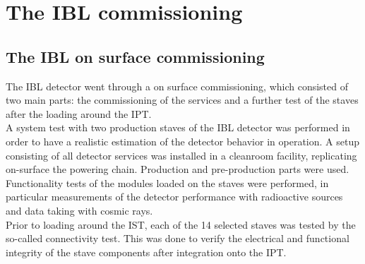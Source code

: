 \section{The IBL commissioning}\label{sec:IBL_commissioning}
\subsection{The IBL on surface commissioning}
%
The IBL detector went through a on surface commissioning, which consisted of two main parts: the commissioning of the services and a further test of the staves after the loading around the IPT.\\
A system test with two production staves of the IBL detector was performed in order to have a realistic estimation of the detector behavior in operation. A setup consisting of all detector services was installed in a cleanroom facility, replicating on-surface the powering chain. Production and pre-production parts were used. Functionality tests of the modules loaded on the staves were performed, in particular measurements of the detector performance with radioactive sources and data taking with cosmic rays.\\
Prior to loading around the IST, each of the 14 selected staves was tested by the so-called connectivity test. This was done to verify the electrical and functional integrity of the stave components after integration onto the IPT.


